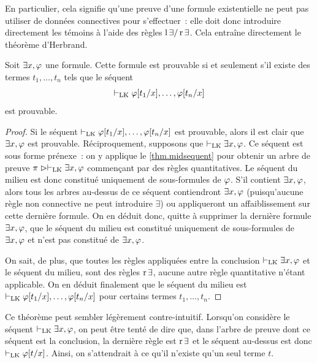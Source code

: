 En particulier, cela signifie qu'une preuve d'une formule existentielle ne peut
pas utiliser de données connectives pour s'effectuer~: elle doit donc
introduire directement les témoins à l'aide des règles $\operatorname{l}\mathord{\exists}/\operatorname{r}\mathord{\exists}$. Cela
entraîne directement le théorème d'Herbrand.

\begin{theorem}\label{thm.Herbrand}
  Soit $\exists x, \varphi$ une formule. Cette formule est prouvable
  si et seulement s'il existe des termes $t_1,\ldots,t_n$ tels que
  le séquent \[\vdash_{\operatorname{LK}}\varphi[t_1/x],\ldots,\varphi[t_n/x]\] est
  prouvable.
\end{theorem}

\begin{proof}
  Si le séquent $\vdash_{\operatorname{LK}}\varphi[t_1/x],\ldots,\varphi[t_n/x]$ est prouvable, alors
  il est clair que
  $\exists x,\varphi$ est prouvable. Réciproquement, supposons que
  $\vdash_{\operatorname{LK}}\exists x,\varphi$. Ce séquent est sous forme prénexe~: on y applique
  le \cref{thm.midsequent} pour obtenir un arbre de preuve
  $\pi\mathrel{\rhd}\vdash_{\operatorname{LK}}\exists x, \varphi$ commençant par des règles
  quantitatives. Le séquent du milieu est donc constitué uniquement de
  sous-formules de $\varphi$. S'il contient $\exists x, \varphi$, alors
  tous les arbres au-dessus de ce séquent contiendront
  $\exists x, \varphi$ (puisqu'aucune règle non connective ne peut
  introduire $\exists$) ou appliqueront un affaiblissement sur cette
  dernière formule. On en déduit donc, quitte à supprimer la dernière
  formule $\exists x, \varphi$, que le séquent du milieu est constitué
  uniquement de sous-formules de $\exists x, \varphi$ et n'est pas
  constitué de $\exists x, \varphi$.

  On sait, de plus, que toutes les règles appliquées entre la conclusion
  $\vdash_{\operatorname{LK}}\exists x, \varphi$ et le séquent du milieu, sont des règles
  $\operatorname{r}\mathord{\exists}$, aucune autre règle quantitative n'étant applicable. On en déduit
  finalement que le séquent du milieu est
  $\vdash_{\operatorname{LK}} \varphi[t_1/x],\ldots,\varphi[t_n/x]$ pour certains termes
  $t_1,\ldots,t_n$.
\end{proof}

Ce théorème peut sembler légèrement contre-intuitif. Lorsqu'on considère le
séquent $\vdash_{\operatorname{LK}}\exists x, \varphi$, on peut être tenté de dire que, dans l'arbre
de preuve dont ce séquent est la conclusion, la dernière règle est $\operatorname{r}\mathord{\exists}$
et le séquent au-dessus est donc $\vdash_{\operatorname{LK}} \varphi[t/x]$. Ainsi, on s'attendrait à
ce qu'il n'existe qu'un seul terme $t$.

